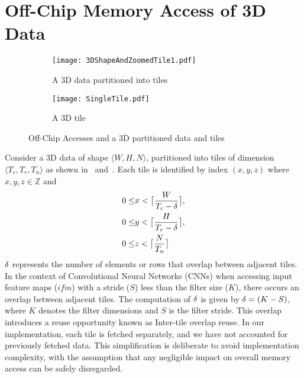 \section{Off-Chip Memory Access of 3D Data}\label{sec:Access3DData}
\begin{figure}[!htb]
	\centering
	\captionsetup{font=sf}
	\begin{subfigure}[t]{0.5\columnwidth}
		\centering
		\texttt{[image: 3DShapeAndZoomedTile1.pdf]}
		\caption{A 3D data partitioned into tiles}
		\label{fig:3dTiledData}
	\end{subfigure}
	\begin{subfigure}[t]{0.4\columnwidth}
		\centering
		\texttt{[image: SingleTile.pdf]}
		\caption{A 3D tile}
		\label{fig:3dTile}
	\end{subfigure}
	\caption{Off-Chip Accesses and a 3D partitioned data and tiles}
	\label{fig:3DPartitionedData}
\end{figure}
Consider a 3D data of shape $\langle W,H,N\rangle$, partitioned into tiles of dimension $\langle T_c,T_r,T_n\rangle$ as shown in~ and~. Each tile is identified by index $(x,y,z)$ where $x, y, z \in \mathbb{Z}$ and 
\begin{align}\label{eq:TileIndexing}
	\begin{aligned}
		0\leq &x<\ceil[\big]{\frac{W}{T_c-\numOverlap}}, \\
		0\leq &y<\ceil[\big]{\frac{H}{T_r-\numOverlap}}, \\
		0\leq &z<\ceil[\big]{\frac{N}{T_n}}
	\end{aligned}
\end{align}
$\numOverlap$ represents the number of elements or rows that overlap between adjacent tiles. In the context of Convolutional Neural Networks (CNNs) when accessing input feature maps ($ifm$) with a stride ($S$) less than the filter size ($K$), there occurs an overlap between adjacent tiles. The computation of $\numOverlap$ is given by $\numOverlap=(K-S)$, where $K$ denotes the filter dimensions and $S$ is the filter stride. This overlap introduces a reuse opportunity known as Inter-tile overlap reuse. In our implementation, each tile is fetched separately, and we have not accounted for previously fetched data. This simplification is deliberate to avoid implementation complexity, with the assumption that any negligible impact on overall memory access can be safely disregarded.

